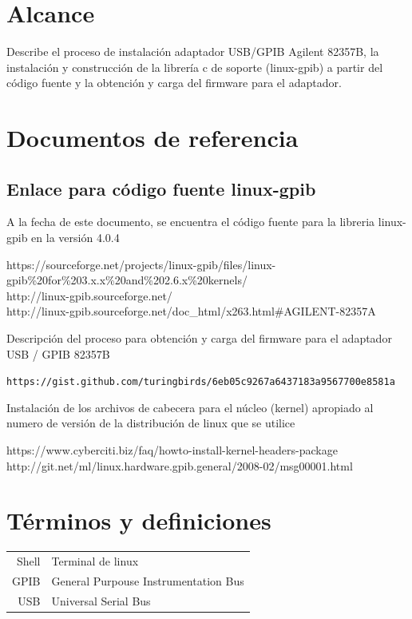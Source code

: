 \documentclass[paper=letter,oneside,fontsize=11pt, parskip=full]{scrartcl}
\newcommand{\code}[1]{{\ttfamily #1}}
\begin{document}
	\section{Alcance}
		Describe el proceso de instalación adaptador USB/GPIB Agilent 82357B, la instalación y construcción de la librería c de soporte (linux-gpib) a partir del código fuente y la obtención y carga del firmware para el adaptador.
	
		
	\section{Documentos de referencia}
	\subsection{Enlace para código fuente linux-gpib}
	A la fecha de este documento, se encuentra el código fuente para la libreria linux-gpib en la versión 4.0.4 
	
	\code{
		https://sourceforge.net/projects/linux-gpib/files/linux-gpib\%20for\%203.x.x\%20and\%202.6.x\%20kernels/ 	\\	
		http://linux-gpib.sourceforge.net/ 	\\	
		http://linux-gpib.sourceforge.net/doc\_html/x263.html\#AGILENT-82357A 	
	}
	
	Descripción del proceso para obtención y carga del firmware para el adaptador USB / GPIB 82357B
	
	\texttt{https://gist.github.com/turingbirds/6eb05c9267a6437183a9567700e8581a}
	
	Instalación de los  archivos de cabecera para el núcleo (kernel) apropiado al numero de versión de la distribución de linux que se utilice
	
	\code{
		https://www.cyberciti.biz/faq/howto-install-kernel-headers-package \\	
		http://git.net/ml/linux.hardware.gpib.general/2008-02/msg00001.html
	}
	
	\section{Términos y definiciones}
	
	\begin{tabular}{rl}
		Shell 	& 	Terminal de linux \\
		GPIB 	& 	General Purpouse Instrumentation Bus \\
		USB		&  	Universal Serial Bus \\
	\end{tabular}
	
\end{document}
